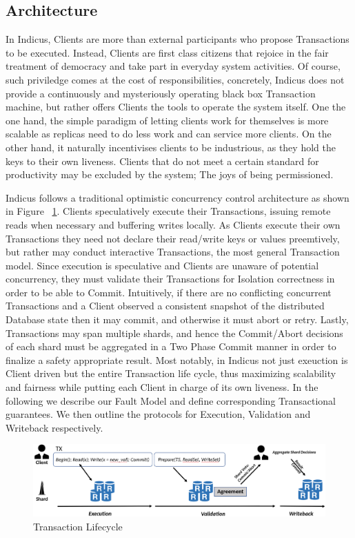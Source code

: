 \subsection{Architecture}
In Indicus, Clients are more than external participants who propose Transactions to be executed. Instead, Clients are first class citizens that rejoice in the fair treatment of democracy and take part in everyday system activities. Of course, such priviledge comes at the cost of responsibilities, concretely, Indicus does not provide a continuously and mysteriously operating black box Transaction machine, but rather offers Clients the tools to operate the system itself. One the one hand, the simple paradigm of letting clients work for themselves is more scalable as replicas need to do less work and can service more clients. On the other hand, it naturally incentivises clients to be industrious, as they hold the keys to their own liveness. Clients that do not meet a certain standard for productivity may be excluded by the system; The joys of being permissioned.

Indicus follows a traditional optimistic concurrency control architecture as shown in Figure ~\ref{fig:Figure1}. Clients speculatively execute their Transactions, issuing remote reads when necessary and buffering writes locally. As Clients execute their own Transactions they need not declare their read/write keys or values preemtively, but rather may conduct interactive Transactions, the most general Transaction model. Since execution is speculative and Clients are unaware of potential concurrency, they must validate their Transactions for Isolation correctness in order to be able to Commit. Intuitively, if there are no conflicting concurrent Transactions and a Client observed a consistent snapshot of the distributed Database state then it may commit, and otherwise it must abort or retry. Lastly, Transactions may span multiple shards, and hence the Commit/Abort decisions of each shard must be aggregated in a Two Phase Commit manner in order to finalize a safety appropriate result. Most notably, in Indicus not just exeuction is Client driven but the entire Transaction life cycle, thus maximizing scalability and fairness while putting each Client in charge of its own liveness.
In the following we describe our Fault Model and define corresponding Transactional guarantees. We then outline the protocols for Execution, Validation and Writeback respectively.

\begin{figure}
\begin{center}
\includegraphics[width= \textwidth]{./figures/LC.png}
\end{center}
\caption{Transaction Lifecycle}
\label{fig:Figure1}
\end{figure}

